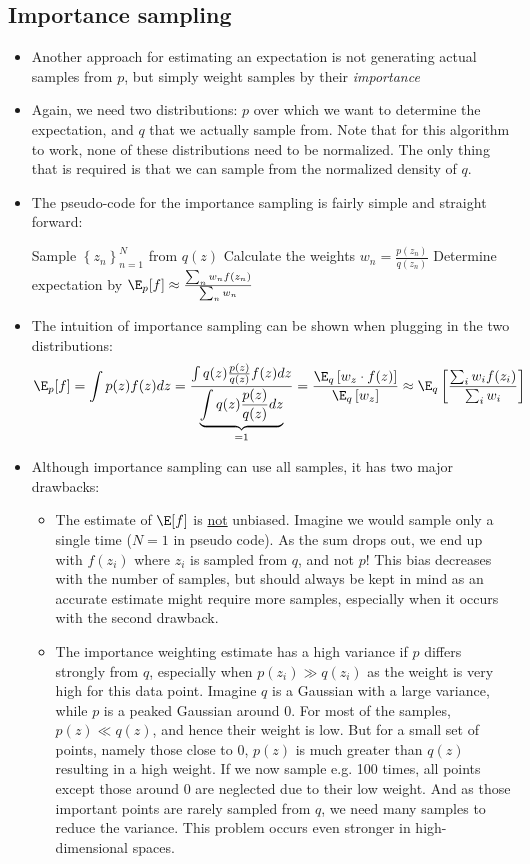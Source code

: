 \subsection{Importance sampling}
\begin{itemize}
	\item Another approach for estimating an expectation is not generating actual samples from $p$, but simply weight samples by their \textit{importance}
	\item Again, we need two distributions: $p$ over which we want to determine the expectation, and $q$ that we actually sample from. Note that for this algorithm to work, none of these distributions need to be normalized. The only thing that is required is that we can sample from the normalized density of $q$.
	\item The pseudo-code for the importance sampling is fairly simple and straight forward: \begin{tcolorbox}[colback=white!85!gray,colframe=gray!75!black,title=Pseudocode for importance sampling]
		\begin{algorithm}[H]
			\SetAlgoLined
			Sample $\left\{z_n\right\}_{n=1}^{N}$ from $q(z)$\;
			Calculate the weights $w_n=\frac{p(z_n)}{q(z_n)}$\;
			Determine expectation by $\E_p[f]\approx \frac{\sum_n w_n f(z_n)}{
			\sum_n w_n}$\;
		\end{algorithm}
	\end{tcolorbox}
	\item The intuition of importance sampling can be shown when plugging in the two distributions:
	$$\E_p[f]=\int p(z)f(z)dz=\frac{\int q(z)\frac{p(z)}{q(z)}f(z)dz}{\underbrace{\int q(z)\frac{p(z)}{q(z)}dz}_{=1}} = \frac{\E_q\left[w_z\cdot f(z)\right]}{\E_q\left[w_z\right]} \approx \E_q\left[\frac{\sum_i w_i f(z_i)}{\sum_i w_i}\right]$$
	\item Although importance sampling can use all samples, it has two major drawbacks:
	\begin{itemize}
		\item The estimate of $\E[f]$ is \underline{not} unbiased. Imagine we would sample only a single time ($N=1$ in pseudo code). As the sum drops out, we end up with $f(z_i)$ where $z_i$ is sampled from $q$, and not $p$! This bias decreases with the number of samples, but should always be kept in mind as an accurate estimate might require more samples, especially when it occurs with the second drawback.
		\item The importance weighting estimate has a high variance if $p$ differs strongly from $q$, especially when $p(z_i)\gg q(z_i)$ as the weight is very high for this data point. Imagine $q$ is a Gaussian with a large variance, while $p$ is a peaked Gaussian around 0. For most of the samples, $p(z)\ll q(z)$, and hence their weight is low. But for a small set of points, namely those close to 0, $p(z)$ is much greater than $q(z)$ resulting in a high weight. If we now sample e.g. 100 times, all points except those around 0 are neglected due to their low weight. And as those important points are rarely sampled from $q$, we need many samples to reduce the variance. This problem occurs even stronger in high-dimensional spaces.

\end{itemize}
\end{itemize}
